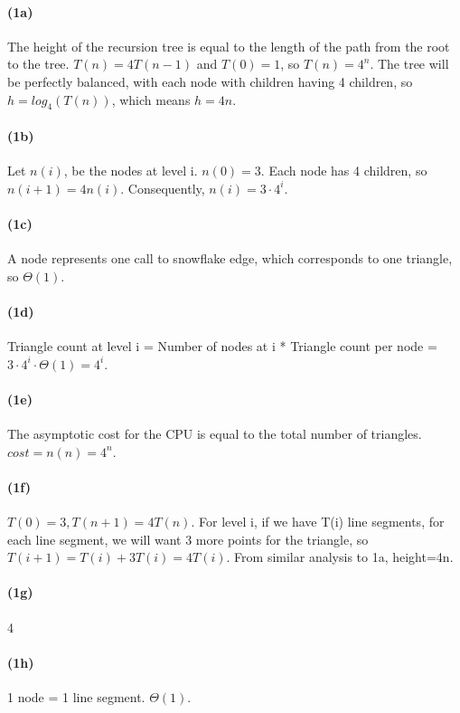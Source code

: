 \documentclass{article}
\begin{document}
\paragraph{(1a)}
The height of the recursion tree is equal to the length of the path from the root to the tree. $T(n)=4T(n-1)$ and $T(0)=1$, so $T(n)=4^{n}$. The tree will be perfectly balanced, with each node with children having 4 children, so $h=log_4(T(n))$, which means $h=4n$.

\paragraph{(1b)}
Let $n(i)$, be the nodes at level i. $n(0) = 3$. Each node has 4 children, so $n(i+1)=4n(i)$. Consequently, $n(i)=3\cdot4^i$.

\paragraph{(1c)}
A node represents one call to snowflake edge, which corresponds to one triangle, so $\Theta(1)$.

\paragraph{(1d)}
Triangle count at level i = Number of nodes at i * Triangle count per node = $3\cdot4^i\cdot\Theta(1)=4^i$.

\paragraph{(1e)}
The asymptotic cost for the CPU is equal to the total number of triangles. $cost = n(n) = 4^n$.

\paragraph{(1f)}
$T(0)=3, T(n+1)=4T(n).$ For level i, if we have T(i) line segments, for each line segment, we will want 3 more points for the triangle, so $T(i+1)=T(i)+3T(i)=4T(i)$. From similar analysis to 1a, height=4n.

\paragraph{(1g)}
4

\paragraph{(1h)}
1 node = 1 line segment. $\Theta(1)$.
\end{document}
